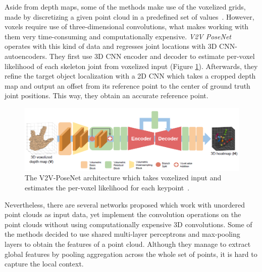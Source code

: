 \vspace{5mm}
\noindent Aside from depth maps, some of the methods make use of the voxelized grids, made by discretizing a given point cloud in a predefined set of values~\cite{DBLP:journals/corr/abs-1812-10320,Lekhwani2019FastV2CHandNetFV,DBLP:journals/corr/abs-1711-07399}. However, voxels require use of three-dimensional convolutions, what makes working with them very time-consuming and computationally expensive. \textit{V2V PoseNet}~\cite{DBLP:journals/corr/abs-1711-07399} operates with this kind of data and regresses joint locations with 3D CNN-autoencoders. They first use 3D CNN encoder and decoder to estimate per-voxel likelihood of each skeleton joint from voxelized input (Figure \ref{fig:v2vposenet}). Afterwards, they refine the target object localization with a 2D CNN which takes a cropped depth map and output an offset from its reference point to the center of ground truth joint positions. This way, they obtain an accurate reference point.\par

\vspace{5mm}
\begin{figure}[H]
\begin{center}
  \includegraphics[width=\textwidth]{images/related_work/v2vposenet.PNG}
  \caption[The V2V-PoseNet architecture~\cite{DBLP:journals/corr/abs-1711-07399}.]{The V2V-PoseNet architecture which takes voxelized input and estimates the per-voxel likelihood for each keypoint~\cite{DBLP:journals/corr/abs-1711-07399}.}
  \label{fig:v2vposenet}
\end{center}
\end{figure}



\noindent Nevertheless, there are several networks proposed which work with unordered point clouds as input data, yet implement the convolution operations on the point clouds without using computationally expensive 3D convolutions. Some of the methods decided to use shared multi-layer perceptrons and max-pooling layers to obtain the features of a point cloud. Although they manage to extract global features by pooling aggregation across the whole set of points, it is hard to capture the local context.\par
\vspace{5mm}


